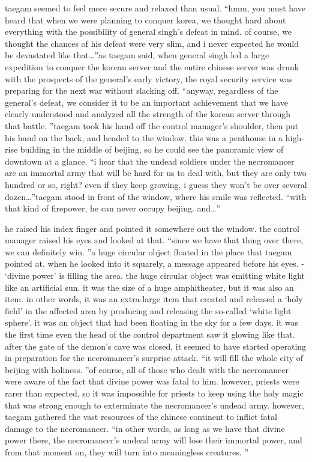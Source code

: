  taegam seemed to feel more secure and relaxed than usual.
“hmm, you must have heard that when we were planning to conquer korea, we thought hard about everything with the possibility of general singh’s defeat in mind.
 of course, we thought the chances of his defeat were very slim, and i never expected he would be devastated like that…”as taegam said, when general singh led a large expedition to conquer the korean server and the entire chinese server was drunk with the prospects of the general’s early victory, the royal security service was preparing for the next war without slacking off.
“anyway, regardless of the general’s defeat, we consider it to be an important achievement that we have clearly understood and analyzed all the strength of the korean server through that battle.
”taegam took his hand off the control manager’s shoulder, then put his hand on the back, and headed to the window.
this was a penthouse in a high-rise building in the middle of beijing, so he could see the panoramic view of downtown at a glance.
“i hear that the undead soldiers under the necromancer are an immortal army that will be hard for us to deal with, but they are only two hundred or so, right? even if they keep growing, i guess they won’t be over several dozen…”taegam stood in front of the window, where his smile was reflected.
“with that kind of firepower, he can never occupy beijing.
 and…”

he raised his index finger and pointed it somewhere out the window.
 the control manager raised his eyes and looked at that.
“since we have that thing over there, we can definitely win.
”a huge circular object floated in the place that taegam pointed at.
when he looked into it squarely, a message appeared before his eyes.
- ‘divine power’ is filling the area.
the huge circular object was emitting white light like an artificial sun.
it was the size of a huge amphitheater, but it was also an item.
in other words, it was an extra-large item that created and released a ‘holy field’ in the affected area by producing and releasing the so-called ‘white light sphere’.
it was an object that had been floating in the sky for a few days.
 it was the first time even the head of the control department saw it glowing like that.
after the gate of the demon’s cave was closed, it seemed to have started operating in preparation for the necromancer’s surprise attack.
“it will fill the whole city of beijing with holiness.
”of course, all of those who dealt with the necromancer were aware of the fact that divine power was fatal to him.
 however, priests were rarer than expected, so it was impossible for priests to keep using the holy magic that was strong enough to exterminate the necromancer’s undead army.
 however, taegam gathered the vast resources of the chinese continent to inflict fatal damage to the necromancer.
“in other words, as long as we have that divine power there, the necromancer’s undead army will lose their immortal power, and from that moment on, they will turn into meaningless creatures.
”

 